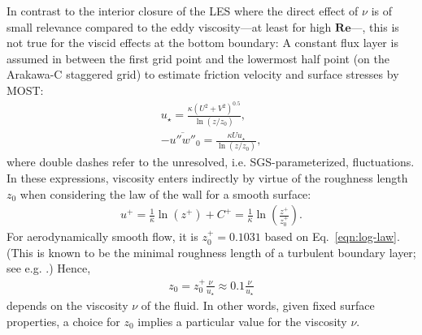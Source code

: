 \documentclass[draft,a4paper,11pt]{article}
\newcommand{\RE}{\mathbf{Re}}
\begin{document}
In contrast to the interior closure of the LES where the direct effect of $\nu$ is of small relevance compared to the eddy viscosity---at least for high $\RE$---, this is not true for the viscid effects at the bottom boundary:  A constant flux layer is assumed in between the first grid point and the lowermost half point (on the Arakawa-C staggered grid) to estimate friction velocity and surface stresses by MOST: 
\begin{align}\label{most}
  u_\star = \frac{\kappa(U^2+V^2)^{0.5}}{\ln\left(z/z_0\right)},\\
  -\overline{u''w''}_0 = \frac{\kappa Uu_\star}{\ln\left(z/z_0\right)}, 
\end{align}
where double dashes refer to the unresolved, i.e. SGS-parameterized, fluctuations. In these expressions, viscosity enters indirectly by virtue of the roughness length $z_0$ when considering the law of the wall for a smooth surface:
\begin{align}
  u^+ = \frac{1}{\kappa}\ln(z^+) + C^+ = \frac{1}{\kappa}\ln\left(\frac{z^+}{z_0^+}\right).
\end{align}
For aerodynamically smooth flow, it is $z_0^+ = 0.1031$ based on Eq.~\ref{eqn:log-law}. (This is known to be the minimal roughness length of a turbulent boundary layer; see e.g. \citealp{kraus2008grundlagen}.) Hence,
\begin{align}
	z_0 = z_0^+\frac{\nu}{u_\star}\approx 0.1\frac{\nu}{u_\star}
\end{align}
depends on the viscosity $\nu$ of the fluid. In other words, given fixed surface properties, a choice for $z_0$ implies a particular value for the viscosity $\nu$.
\end{document}
